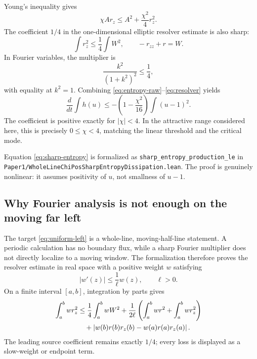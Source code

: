 \documentclass[11pt]{article}
\newcommand{\abs}[1]{\left\lvert #1\right\rvert}
\newcommand{\code}[1]{\nolinkurl{#1}}
\begin{document}
Young's inequality gives
\[
  \chi A r_z\le A^2+\frac{\chi^2}{4}r_z^2.
\]
The coefficient \(1/4\) in the one-dimensional elliptic resolver estimate is
also sharp:
\begin{equation}
  \int r_z^2\le\frac14\int W^2,
  \qquad -r_{zz}+r=W.                                  \label{eq:resolver}
\end{equation}
In Fourier variables, the multiplier is
\[
  \frac{k^2}{(1+k^2)^2}\le\frac14,
\]
with equality at \(k^2=1\).  Combining
\eqref{eq:entropy-raw}--\eqref{eq:resolver} yields
\begin{equation}
  \frac{d}{dt}\int h(u)
  \le-\left(1-\frac{\chi^2}{16}\right)\int(u-1)^2.
  \label{eq:sharp-entropy}
\end{equation}
The coefficient is positive exactly for \(\abs\chi<4\).  In the attractive
range considered here, this is precisely \(0\le\chi<4\), matching the linear
threshold and the critical mode.

\noindent Equation \eqref{eq:sharp-entropy} is formalized as
\code{sharp_entropy_production_le} in
\code{Paper1/WholeLineChiPosSharpEntropyDissipation.lean}.  The proof is
genuinely nonlinear: it assumes positivity of \(u\), not smallness of
\(u-1\).

\subsection{Why Fourier analysis is not enough on the moving far left}

The target \eqref{eq:uniform-left} is a whole-line, moving-half-line
statement.  A periodic calculation has no boundary flux, while a sharp
Fourier multiplier does not directly localize to a moving window.  The
formalization therefore proves the resolver estimate in real space with a
positive weight \(w\) satisfying
\begin{equation}
  \abs{w'(z)}\le\frac1\ell w(z),\qquad \ell>0.           \label{eq:slow-weight}
\end{equation}
On a finite interval \([a,b]\), integration by parts gives
\begin{align}
 \int_a^b w r_z^2
 &\le \frac14\int_a^b wW^2
 +\frac1{2\ell}
   \left(\int_a^b wr^2+\int_a^b wr_z^2\right) \notag\\
 &\quad
 +\abs{w(b)r(b)r_z(b)-w(a)r(a)r_z(a)}.                 \label{eq:weighted-resolver}
\end{align}
The leading source coefficient remains exactly \(1/4\); every loss is
displayed as a slow-weight or endpoint term.
\end{document}
